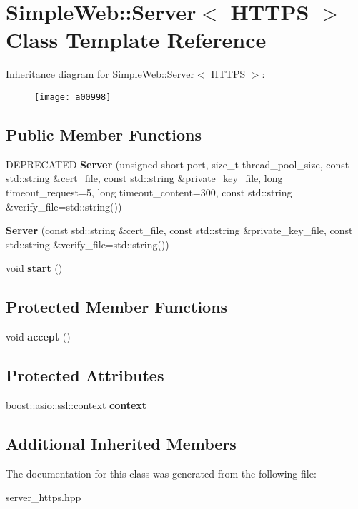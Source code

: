 \hypertarget{a00998}{}\section{Simple\+Web\+:\+:Server$<$ H\+T\+T\+PS $>$ Class Template Reference}
\label{a00998}
Inheritance diagram for Simple\+Web\+:\+:Server$<$ H\+T\+T\+PS $>$\+:\begin{figure}[H]
\begin{center}
\leavevmode
\texttt{[image: a00998]}
\end{center}
\end{figure}
\subsection*{Public Member Functions}
\begin{DoxyCompactItemize}
\item 
\mbox{\label{a00998_a1a5530e96cd973de3dc987034ca61b54}} 
D\+E\+P\+R\+E\+C\+A\+T\+ED {\bfseries Server} (unsigned short port, size\+\_\+t thread\+\_\+pool\+\_\+size, const std\+::string \&cert\+\_\+file, const std\+::string \&private\+\_\+key\+\_\+file, long timeout\+\_\+request=5, long timeout\+\_\+content=300, const std\+::string \&verify\+\_\+file=std\+::string())
\item 
\mbox{\label{a00998_a15bb179287dfaa18da16b8877174e8d6}} 
{\bfseries Server} (const std\+::string \&cert\+\_\+file, const std\+::string \&private\+\_\+key\+\_\+file, const std\+::string \&verify\+\_\+file=std\+::string())
\item 
\mbox{\label{a00998_a6a740b3fdbbbf178f540e27942cc93fc}} 
void {\bfseries start} ()
\end{DoxyCompactItemize}
\subsection*{Protected Member Functions}
\begin{DoxyCompactItemize}
\item 
\mbox{\label{a00998_af722d2884eafafada7073feb7793c422}} 
void {\bfseries accept} ()
\end{DoxyCompactItemize}
\subsection*{Protected Attributes}
\begin{DoxyCompactItemize}
\item 
\mbox{\label{a00998_ade0b1e6f826fd76ba6c6253d352fd93c}} 
boost\+::asio\+::ssl\+::context {\bfseries context}
\end{DoxyCompactItemize}
\subsection*{Additional Inherited Members}


The documentation for this class was generated from the following file\+:\begin{DoxyCompactItemize}
\item 
server\+\_\+https.\+hpp\end{DoxyCompactItemize}
